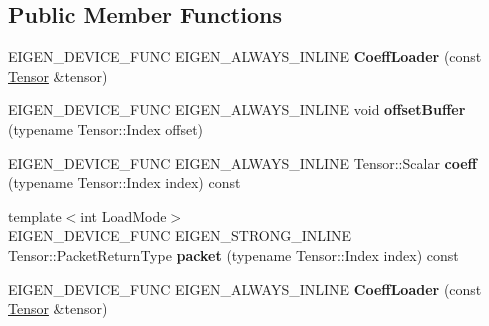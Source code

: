 \subsection*{Public Member Functions}
\begin{DoxyCompactItemize}
\item 
\mbox{\label{struct_eigen_1_1internal_1_1_coeff_loader_3_01_tensor_00_01true_01_4_a7efb1b9d1a0e1d153601b711389dc244}} 
E\+I\+G\+E\+N\+\_\+\+D\+E\+V\+I\+C\+E\+\_\+\+F\+U\+NC E\+I\+G\+E\+N\+\_\+\+A\+L\+W\+A\+Y\+S\+\_\+\+I\+N\+L\+I\+NE {\bfseries Coeff\+Loader} (const \hyperlink{class_eigen_1_1_tensor}{Tensor} \&tensor)
\item 
\mbox{\label{struct_eigen_1_1internal_1_1_coeff_loader_3_01_tensor_00_01true_01_4_ae661b2ae71d66ef7fbe049fba545c873}} 
E\+I\+G\+E\+N\+\_\+\+D\+E\+V\+I\+C\+E\+\_\+\+F\+U\+NC E\+I\+G\+E\+N\+\_\+\+A\+L\+W\+A\+Y\+S\+\_\+\+I\+N\+L\+I\+NE void {\bfseries offset\+Buffer} (typename Tensor\+::\+Index offset)
\item 
\mbox{\label{struct_eigen_1_1internal_1_1_coeff_loader_3_01_tensor_00_01true_01_4_a2fd50cc8446af0bba6553a709d331d37}} 
E\+I\+G\+E\+N\+\_\+\+D\+E\+V\+I\+C\+E\+\_\+\+F\+U\+NC E\+I\+G\+E\+N\+\_\+\+A\+L\+W\+A\+Y\+S\+\_\+\+I\+N\+L\+I\+NE Tensor\+::\+Scalar {\bfseries coeff} (typename Tensor\+::\+Index index) const
\item 
\mbox{\label{struct_eigen_1_1internal_1_1_coeff_loader_3_01_tensor_00_01true_01_4_a1fe63149a6935cb39d3a054adc991de8}} 
{\footnotesize template$<$int Load\+Mode$>$ }\\E\+I\+G\+E\+N\+\_\+\+D\+E\+V\+I\+C\+E\+\_\+\+F\+U\+NC E\+I\+G\+E\+N\+\_\+\+S\+T\+R\+O\+N\+G\+\_\+\+I\+N\+L\+I\+NE Tensor\+::\+Packet\+Return\+Type {\bfseries packet} (typename Tensor\+::\+Index index) const
\item 
\mbox{\label{struct_eigen_1_1internal_1_1_coeff_loader_3_01_tensor_00_01true_01_4_a7efb1b9d1a0e1d153601b711389dc244}} 
E\+I\+G\+E\+N\+\_\+\+D\+E\+V\+I\+C\+E\+\_\+\+F\+U\+NC E\+I\+G\+E\+N\+\_\+\+A\+L\+W\+A\+Y\+S\+\_\+\+I\+N\+L\+I\+NE {\bfseries Coeff\+Loader} (const \hyperlink{class_eigen_1_1_tensor}{Tensor} \&tensor)

\end{DoxyCompactItemize}
